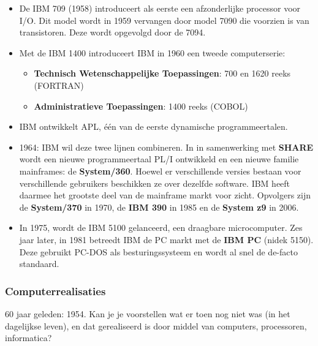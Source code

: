 \documentclass[../main.tex]{subfiles}
\begin{document}
\begin{solution}
\begin{itemize}
	\item De IBM 709 (1958) introduceert als eerste een afzonderlijke processor voor I/O. Dit model wordt in 1959 vervangen door model 7090 die voorzien is van transistoren. Deze wordt opgevolgd door de 7094.
	\item Met de IBM 1400 introduceert IBM in 1960 een tweede computerserie:
	\begin{itemize}
		\item \textbf{Technisch Wetenschappelijke Toepassingen}: 700 en 1620 reeks (FORTRAN)
		\item \textbf{Administratieve Toepassingen}: 1400 reeks (COBOL)
	\end{itemize}
	\item IBM ontwikkelt APL, \'e\'en van de eerste dynamische programmeertalen.
	\item 1964: IBM wil deze twee lijnen combineren. In in samenwerking met \textbf{SHARE} wordt een nieuwe programmeertaal PL/I ontwikkeld en een nieuwe familie mainframes: de \textbf{System/360}. Hoewel er verschillende versies bestaan voor verschillende gebruikers beschikken ze over dezelfde software. IBM heeft daarmee het grootste deel van de mainframe markt voor zicht. Opvolgers zijn de \textbf{System/370} in 1970, de \textbf{IBM 390} in 1985 en de \textbf{System z9} in 2006.
	\item In 1975, wordt de IBM 5100 gelanceerd, een draagbare microcomputer. Zes jaar later, in 1981 betreedt IBM de PC markt met de \textbf{IBM PC} (nidek 5150). Deze gebruikt PC-DOS als besturingssysteem en wordt al snel de de-facto standaard.
\end{itemize}
\end{solution}

\subsubsection{Computerrealisaties}
\begin{question}
60 jaar geleden: 1954. Kan je je voorstellen wat er toen nog niet was (in het dagelijkse leven), en dat gerealiseerd is door middel van computers, processoren, informatica?
\end{question}
\end{document}
